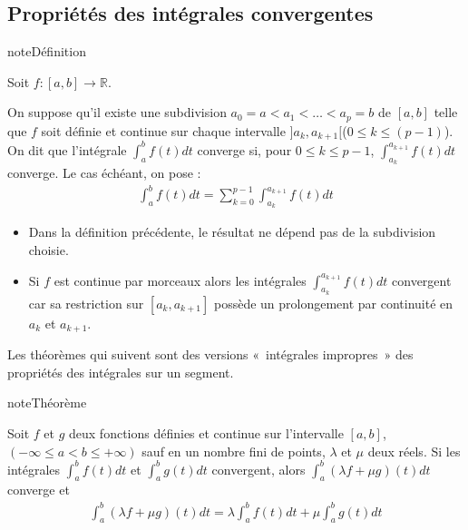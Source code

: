 \documentclass[letterpaper,10pt,french]{sphinxmanual}
\begin{document}
\subsection{Propriétés des intégrales convergentes}
\label{\detokenize{def:proprietes-des-integrales-convergentes}}
\begin{sphinxadmonition}{note}{Définition}

\sphinxAtStartPar
Soit \(f : [a, b] \to \mathbb R\).

\sphinxAtStartPar
On suppose qu’il existe une subdivision \(a_0=a < a_1 < \ldots < a_p=b\) de \([a, b]\) telle que \(f\) soit définie et continue sur chaque intervalle \(]a_k, a_{k+1}[\)(\(0\leq k \leq (p-1)\)). On dit que l’intégrale \(\int_a^b f(t)dt\) converge si, pour \(0\leq k \leq p-1\), \(\int_{a_{k}}^{a_{k+1}} f(t)dt\) converge. Le cas échéant, on pose :
\begin{equation*}
\begin{split}
\int_a^b f(t)dt = \sum_{k=0}^{p-1} \int_{a_{k}}^{a_{k+1}} f(t)dt
\end{split}
\end{equation*}\end{sphinxadmonition}

\sphinxAtStartPar
{}
\begin{itemize}
\item {} 
\sphinxAtStartPar
Dans la définition précédente, le résultat ne dépend pas de la subdivision choisie.

\item {} 
\sphinxAtStartPar
Si \(f\) est continue par morceaux alors les intégrales \(\int_{a_{k}}^{a_{k+1}} f(t)dt\) convergent car sa restriction sur \([a_k, a_{k+1}]\) possède un prolongement par continuité en \(a_k\) et \(a_{k+1}\).

\end{itemize}

\sphinxAtStartPar
Les théorèmes qui suivent sont des versions « intégrales impropres » des propriétés des intégrales sur un segment.

\begin{sphinxadmonition}{note}{Théorème}

\sphinxAtStartPar
Soit \(f\) et \(g\) deux fonctions définies et continue sur l’intervalle \([a, b]\), \((-\infty \leq a < b \leq +\infty)\) sauf en un nombre fini de points, \(\lambda\) et \(\mu\) deux réels. Si les intégrales \(\int_a^b f(t)dt\) et \(\int_a^b g(t)dt\) convergent, alors \(\int_a^b (\lambda f + \mu g)(t)dt\) converge et
\begin{equation*}
\begin{split}
\int_a^b (\lambda f + \mu g)(t)dt = \lambda\int_a^b f(t)dt + \mu\int_a^b g(t)dt
\end{split}
\end{equation*}\end{sphinxadmonition}
\end{document}
